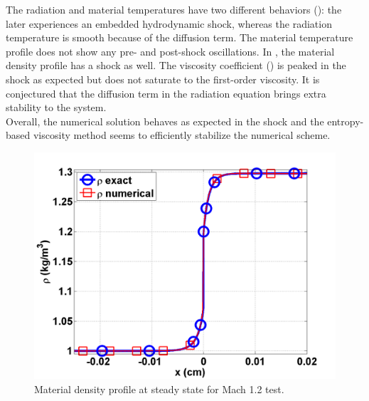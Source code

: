 The radiation and material temperatures have two different behaviors (): the later experiences an embedded hydrodynamic shock, whereas the radiation temperature is smooth because of the diffusion term. The material temperature profile does not show any pre- and post-shock oscillations. In , the material density profile has a shock as well. The viscosity coefficient () is peaked in the shock as expected but does not saturate to the first-order viscosity. It is conjectured that the diffusion term in the radiation equation brings extra stability to the system. \\
Overall, the numerical solution behaves as expected in the shock and the entropy-based viscosity method seems to efficiently stabilize the numerical scheme.  
\begin{figure}[H]
                \centering
                \includegraphics[width=\textwidth]{figures/Mach_1p2_nel_1000_density.png}
        \caption{Material density profile at steady state for Mach 1.2 test.}\label{fig:Mach12_density}
\end{figure}
